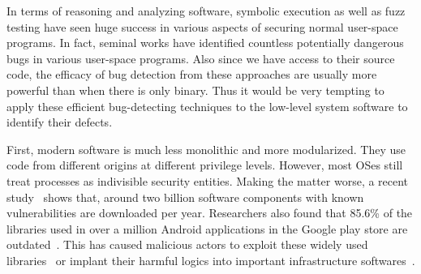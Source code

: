 In terms of reasoning and analyzing software, symbolic execution as well as fuzz testing have seen huge success in various aspects of securing normal user-space programs. In fact, seminal works  have identified countless potentially dangerous bugs in various user-space programs. Also since we have access to their source code, the efficacy of bug detection from these approaches are usually more powerful than when there is only binary. Thus it would be very tempting to apply these efficient bug-detecting techniques to the low-level system software to identify their defects.

First, modern software is much less monolithic and more modularized. They use code from different origins at different privilege levels. 
However, most OSes still treat processes as indivisible security entities. Making the matter worse, a recent study~\cite{enigmasurvey} shows that, around two billion software components with known vulnerabilities are downloaded per year. 
Researchers also found that 85.6\% of the libraries used in over a million Android applications in the Google play store are outdated~\cite{3rdpartysurvey}. 
This has caused malicious actors to exploit these widely used libraries~\cite{taomikesdk,baidusdk,fbsdk,dropboxsdk} or implant their harmful logics into important infrastructure softwares~\cite{xcodeghost}. 

